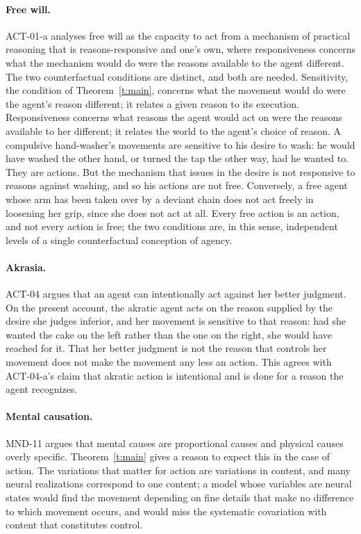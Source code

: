 \documentclass{situationist-preprint}
\begin{document}
\paragraph{Free will.} ACT-01-a analyses free will as the capacity to act from a mechanism of practical reasoning that is reasons-responsive and one's own, where responsiveness concerns what the mechanism would do were the reasons available to the agent different. The two counterfactual conditions are distinct, and both are needed. Sensitivity, the condition of Theorem~\ref{t:main}, concerns what the movement would do were the agent's reason different; it relates a given reason to its execution. Responsiveness concerns what reasons the agent would act on were the reasons available to her different; it relates the world to the agent's choice of reason. A compulsive hand-washer's movements are sensitive to his desire to wash: he would have washed the other hand, or turned the tap the other way, had he wanted to. They are actions. But the mechanism that issues in the desire is not responsive to reasons against washing, and so his actions are not free. Conversely, a free agent whose arm has been taken over by a deviant chain does not act freely in loosening her grip, since she does not act at all. Every free action is an action, and not every action is free; the two conditions are, in this sense, independent levels of a single counterfactual conception of agency.

\paragraph{Akrasia.} ACT-04 argues that an agent can intentionally act against her better judgment. On the present account, the akratic agent acts on the reason supplied by the desire she judges inferior, and her movement is sensitive to that reason: had she wanted the cake on the left rather than the one on the right, she would have reached for it. That her better judgment is not the reason that controls her movement does not make the movement any less an action. This agrees with ACT-04-a's claim that akratic action is intentional and is done for a reason the agent recognizes.

\paragraph{Mental causation.} MND-11 argues that mental causes are proportional causes and physical causes overly specific. Theorem~\ref{t:main} gives a reason to expect this in the case of action. The variations that matter for action are variations in content, and many neural realizations correspond to one content; a model whose variables are neural states would find the movement depending on fine details that make no difference to which movement occurs, and would miss the systematic covariation with content that constitutes control.
\end{document}
